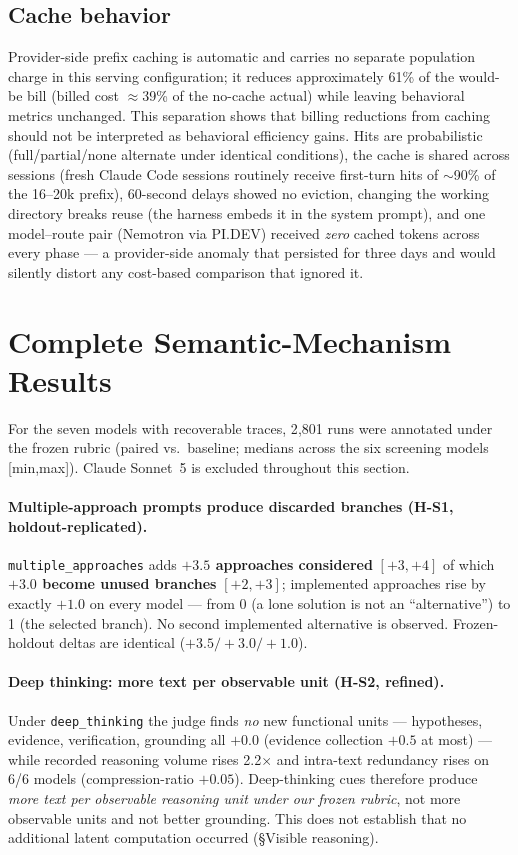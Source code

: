\documentclass[11pt]{article}
\newcommand{\pidev}{PI.DEV}
\newcommand{\cc}{Claude Code}
\newcommand{\xd}{$\times$}
\begin{document}
\subsection{Cache behavior}

Provider-side prefix caching is automatic and carries no separate population
charge in this serving configuration; it reduces approximately 61\% of the
would-be bill (billed cost $\approx$39\% of the no-cache actual) while
leaving behavioral metrics unchanged. This separation shows that
billing reductions from caching should not be interpreted as behavioral
efficiency gains. Hits are probabilistic (full/partial/none alternate under
identical conditions), the cache is shared across sessions (fresh \cc{}
sessions routinely receive first-turn hits of $\sim$90\% of the 16--20k
prefix), 60-second delays showed no eviction, changing the working
directory breaks reuse (the harness embeds it in the system prompt), and
one model--route pair (Nemotron via \pidev) received \emph{zero} cached
tokens across every phase --- a provider-side anomaly that persisted for
three days and would silently distort any cost-based comparison that
ignored it.

\section{Complete Semantic-Mechanism Results}

For the seven models with recoverable traces, 2{,}801 runs were annotated
under the frozen rubric (paired vs.\ baseline; medians across the six
screening models [min,max]). Claude Sonnet~5 is excluded throughout this
section.

\paragraph{Multiple-approach prompts produce discarded branches (H-S1,
holdout-replicated).} \texttt{multiple\_approaches} adds \textbf{$+3.5$
approaches considered} $[+3,+4]$ of which \textbf{$+3.0$ become unused
branches} $[+2,+3]$; implemented approaches rise by exactly $+1.0$ on
every model --- from 0 (a lone solution is not an ``alternative'') to 1
(the selected branch). No second implemented alternative is observed. Frozen-holdout deltas are identical ($+3.5/+3.0/+1.0$).

\paragraph{Deep thinking: more text per observable unit (H-S2, refined).}
Under \texttt{deep\_thinking} the judge finds \emph{no} new functional
units --- hypotheses, evidence, verification, grounding all $+0.0$
(evidence collection $+0.5$ at most) --- while recorded reasoning volume
rises 2.2\xd{} and intra-text redundancy rises on 6/6 models
(compression-ratio $+0.05$). Deep-thinking cues therefore produce
\emph{more text per observable reasoning unit under our frozen rubric},
not more observable units and not better grounding. This does not
establish that no additional latent computation occurred (\S Visible
reasoning).
\end{document}

